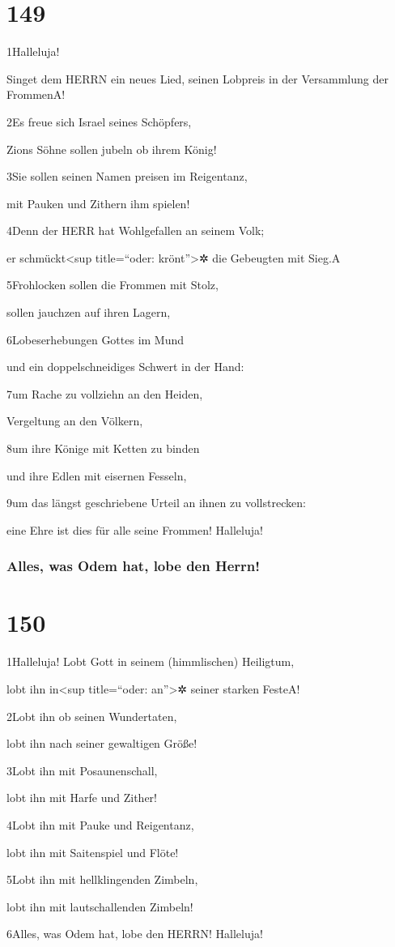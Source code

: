 \hypertarget{section-148}{%
\section{149}\label{section-148}}

1Halleluja!

Singet dem HERRN ein neues Lied, seinen Lobpreis in der Versammlung der
Frommen{A}!

2Es freue sich Israel seines Schöpfers,

Zions Söhne sollen jubeln ob ihrem König!

3Sie sollen seinen Namen preisen im Reigentanz,

mit Pauken und Zithern ihm spielen!

4Denn der HERR hat Wohlgefallen an seinem Volk;

er schmückt\textless sup title=``oder: krönt''\textgreater✲ die
Gebeugten mit Sieg.{A}

5Frohlocken sollen die Frommen mit Stolz,

sollen jauchzen auf ihren Lagern,

6Lobeserhebungen Gottes im Mund

und ein doppelschneidiges Schwert in der Hand:

7um Rache zu vollziehn an den Heiden,

Vergeltung an den Völkern,

8um ihre Könige mit Ketten zu binden

und ihre Edlen mit eisernen Fesseln,

9um das längst geschriebene Urteil an ihnen zu vollstrecken:

eine Ehre ist dies für alle seine Frommen! Halleluja!

\hypertarget{alles-was-odem-hat-lobe-den-herrn}{%
\subsubsection{Alles, was Odem hat, lobe den
Herrn!}\label{alles-was-odem-hat-lobe-den-herrn}}

\hypertarget{section-149}{%
\section{150}\label{section-149}}

1Halleluja! Lobt Gott in seinem (himmlischen) Heiligtum,

lobt ihn in\textless sup title=``oder: an''\textgreater✲ seiner starken
Feste{A}!

2Lobt ihn ob seinen Wundertaten,

lobt ihn nach seiner gewaltigen Größe!

3Lobt ihn mit Posaunenschall,

lobt ihn mit Harfe und Zither!

4Lobt ihn mit Pauke und Reigentanz,

lobt ihn mit Saitenspiel und Flöte!

5Lobt ihn mit hellklingenden Zimbeln,

lobt ihn mit lautschallenden Zimbeln!

6Alles, was Odem hat, lobe den HERRN! Halleluja!
